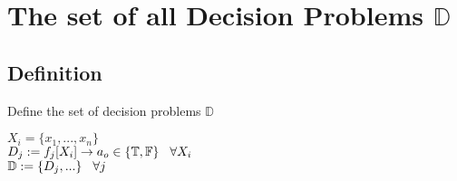 \documentclass[11pt]{article}
\begin{document}
\section{The set of all Decision Problems $\mathbb{D}$}

\subsection{Definition}
Define the set of decision problems $\mathbb{D}$
\begin{center}
$
X_i = \{x_1,...,x_n\}
$
\\ \vspace{2mm}
$
D_j := f_j \lbrack X_i \rbrack \rightarrow a_{o} \in \{\mathbb{T}, \mathbb{F}\} \hspace{3mm} \forall X_i
$
\\ \vspace{2mm}
$\mathbb{D} := \{D_j,...\} \hspace{3mm} \forall j$
\end{center}






\end{document}
